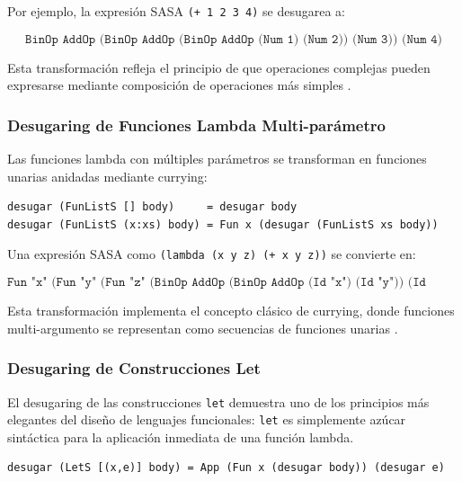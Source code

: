 \documentclass[a4paper,12pt]{article}
\begin{document}
Por ejemplo, la expresión SASA \texttt{(+ 1 2 3 4)} se desugarea a:

\begin{equation*}
\texttt{BinOp AddOp (BinOp AddOp (BinOp AddOp (Num 1) (Num 2)) (Num 3)) (Num 4)}
\end{equation*}

Esta transformación refleja el principio de que operaciones complejas pueden expresarse mediante composición de operaciones más simples \cite{Krishnamurthi2015}.

\subsubsection{Desugaring de Funciones Lambda Multi-parámetro}

Las funciones lambda con múltiples parámetros se transforman en funciones unarias anidadas mediante currying:

\begin{lstlisting}[style=haskellstyle, caption={Desugaring de funciones lambda}]
desugar (FunListS [] body)     = desugar body
desugar (FunListS (x:xs) body) = Fun x (desugar (FunListS xs body))
\end{lstlisting}

Una expresión SASA como \texttt{(lambda (x y z) (+ x y z))} se convierte en:

\begin{equation*}
\texttt{Fun "x" (Fun "y" (Fun "z" (BinOp AddOp (BinOp AddOp (Id "x") (Id "y")) (Id "z"))))}
\end{equation*}

Esta transformación implementa el concepto clásico de currying, donde funciones multi-argumento se representan como secuencias de funciones unarias \cite{Krishnamurthi2015,Rathi2020}.

\subsubsection{Desugaring de Construcciones Let}

El desugaring de las construcciones \texttt{let} demuestra uno de los principios más elegantes del diseño de lenguajes funcionales: \texttt{let} es simplemente azúcar sintáctica para la aplicación inmediata de una función lambda.

\begin{lstlisting}[style=haskellstyle, caption={Desugaring de let}]
desugar (LetS [(x,e)] body) = App (Fun x (desugar body)) (desugar e)
\end{lstlisting}
\end{document}
